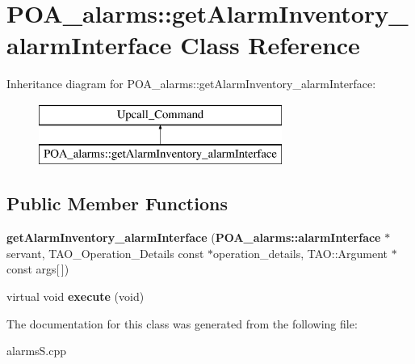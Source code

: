 \section{P\+O\+A\+\_\+alarms\+:\+:get\+Alarm\+Inventory\+\_\+alarm\+Interface Class Reference}
\label{classPOA__alarms_1_1getAlarmInventory__alarmInterface}
Inheritance diagram for P\+O\+A\+\_\+alarms\+:\+:get\+Alarm\+Inventory\+\_\+alarm\+Interface\+:\begin{figure}[H]
\begin{center}
\leavevmode
\includegraphics[height=2.000000cm]{classPOA__alarms_1_1getAlarmInventory__alarmInterface}
\end{center}
\end{figure}
\subsection*{Public Member Functions}
\begin{DoxyCompactItemize}
\item 
{\bfseries get\+Alarm\+Inventory\+\_\+alarm\+Interface} ({\bf P\+O\+A\+\_\+alarms\+::alarm\+Interface} $\ast$servant, T\+A\+O\+\_\+\+Operation\+\_\+\+Details const $\ast$operation\+\_\+details, T\+A\+O\+::\+Argument $\ast$const args[$\,$])\label{classPOA__alarms_1_1getAlarmInventory__alarmInterface_a8bee5ad1e2059494f2893707d2bc2a06}

\item 
virtual void {\bfseries execute} (void)\label{classPOA__alarms_1_1getAlarmInventory__alarmInterface_af16700cc646b2cf85c150a28a93ee3f4}

\end{DoxyCompactItemize}


The documentation for this class was generated from the following file\+:\begin{DoxyCompactItemize}
\item 
alarms\+S.\+cpp\end{DoxyCompactItemize}
